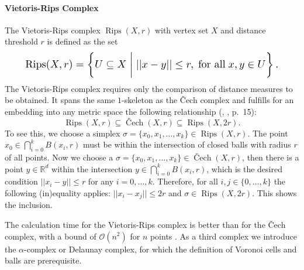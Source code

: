 \documentclass{article}
\DeclareMathOperator{\Cech}{\text{\v{C}ech}}
\DeclareMathOperator{\Rips}{\text{Rips}}
\begin{document}
\paragraph{Vietoris-Rips Complex \cite{boissonnat2018geometric}}
The Vietoris-Rips complex $\Rips(X,r)$ with vertex set $X$ and distance threshold $r$ is defined as the set
\begin{equation}
	\label{rips}
\resizebox{0.9\columnwidth}{!}
{$\Rips(X,r) = \left\{ U \subseteq X \; \bigg\rvert \; ||x-y|| \leq r, \; \text{for all} \; x,y \in U \right\}.$}
\end{equation}
The Vietoris-Rips complex requires only the comparison of distance measures to be obtained. It spans the same $1$-skeleton as the \v{C}ech complex and fulfills for an embedding into any metric space the following relationship (\citeauthor{boissonnat2018geometric}, \citeyear{boissonnat2018geometric}, p.~15):
\begin{equation}
	\label{eq:inc}
	\Rips(X,r)\subseteq \Cech(X,r) \subseteq \Rips(X,2r).
\end{equation}
To see this, we choose a simplex $\sigma = \{x_0,x_1,\ldots,x_k\} \in \Rips(X,r)$. The point $x_0 \in \bigcap_{i=0}^{k}B(x_i,r)$ must be within the intersection of closed balls with radius $r$ of all points. Now we choose a $\sigma = \{x_0,x_1,\ldots,x_k\} \in \Cech(X,r)$, then there is a point $y \in \mathbb{R}^d$ within the intersection $y \in \bigcap_{i=0}^{k}B(x_i,r)$, which is the desired condition $||x_i-y|| \leq r$ for any $i = 0,\ldots,k$. Therefore, for all $i,j \in \{0,\ldots,k\}$ the following (in)equality applies: $||x_i-x_j|| \leq 2r$ and $\sigma \in \Rips(X,2r)$. This shows the inclusion.

The calculation time for the Vietoris-Rips complex is better than for the \v{C}ech complex, with a bound of $\mathcal{O}(n^2)$ for $n$ points \cite{Zomorodian10}. As a third complex we introduce the $\alpha$-complex or Delaunay complex, for which the definition of Voronoi cells and balls are prerequisite.

\end{document}
